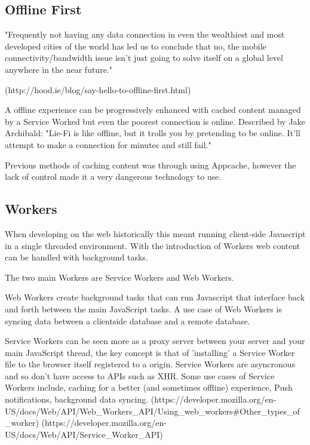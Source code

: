 

\subsection{Offline First}

"Frequently not having any data connection in even the wealthiest and most developed cities of the world has led us to conclude that no, the mobile connectivity/bandwidth issue isn’t just going to solve itself on a global level anywhere in the near future." 

(http://hood.ie/blog/say-hello-to-offline-first.html)


A offline experience can be progressively enhanced with cached content managed by a Service Worked but even the poorest connection is online.
Described by Jake Archibald: "Lie-Fi is like offline, but it trolls you by pretending to be online. It'll attempt to make a connection for minutes and still fail."

Previous methods of caching content was through using Appcache, however the lack of control made it a very dangerous technology to use. %


\subsection{Workers}

When developing on the web historically this meant running client-side Javascript in a single threaded environment. With the introduction of Workers web content can be handled with background tasks.

The two main Workers are Service Workers and Web Workers.

Web Workers create background tasks that can run Javascript that interface back and forth between the main JavaScript tasks. A use case of Web Workers is syncing data between a clientside database and a remote database. 

Service Workers can be seen more as a proxy server between your server and your main JavaScript thread, the key concept is that of 'installing' a Service Worker file to the browser itself registered to a origin. Service Workers are asyncronous and so don't have access to APIs such as XHR.
Some use cases of Service Workers include, caching for a better (and sometimes offline) experience, Push notifications, background data syncing.
(https://developer.mozilla.org/en-US/docs/Web/API/Web_Workers_API/Using_web_workers#Other_types_of_worker)
(https://developer.mozilla.org/en-US/docs/Web/API/Service_Worker_API)


